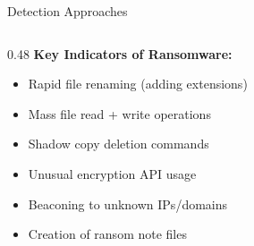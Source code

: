 \documentclass[aspectratio=169]{beamer}
\begin{document}
\begin{frame}{Detection Approaches}
\begin{columns}[T]
\begin{column}{0.48\textwidth}
      \vspace{0.5em}
      \textbf{Key Indicators of Ransomware:}
      \begin{itemize}
        \item Rapid file renaming (adding extensions)
        \item Mass file read + write operations
        \item Shadow copy deletion commands
        \item Unusual encryption API usage
        \item Beaconing to unknown IPs/domains
        \item Creation of ransom note files
      \end{itemize}
    \end{column}
  \end{columns}
\end{frame}
\end{document}
